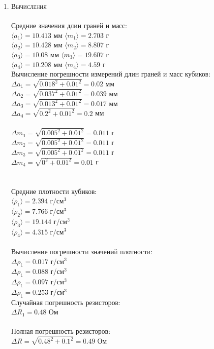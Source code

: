 \documentclass[12pt]{article}
\begin{document}
\begin{enumerate}
    \item \large\textsc{Вычисления} \\
    \\
    Средние значения длин граней и масс: \\
    $ \langle a_1 \rangle = 10.413 $ мм $ \langle m_1 \rangle = 2.703 $ г \\
    $ \langle a_2 \rangle = 10.428 $ мм $ \langle m_2 \rangle = 8.807 $ г \\
    $ \langle a_3 \rangle = 10.08 $ мм $ \langle m_3 \rangle = 19.607 $ г \\
    $ \langle a_4 \rangle = 10.208 $ мм $ \langle m_4 \rangle = 4.59 $ г \\
    Вычисление погрешности измерений длин граней и масс кубиков: \\ 
    $\Delta a_1 = \sqrt{0.018^2 + 0.01^2} = 0.02$ мм \\
    $\Delta a_2 = \sqrt{0.037^2 + 0.01^2} = 0.039$ мм\\
    $\Delta a_3 = \sqrt{0.013^2 + 0.01^2} = 0.017$ мм\\
    $\Delta a_4 = \sqrt{0.2^2 + 0.01^2} = 0.2$ мм\\
    \\
    $\Delta m_1 = \sqrt{0.005^2 + 0.01^2} = 0.011$ г \\
    $\Delta m_2 = \sqrt{0.005^2 + 0.01^2} = 0.011$ г \\
    $\Delta m_3 = \sqrt{0.005^2 + 0.01^2} = 0.011$ г \\
    $\Delta m_4 = \sqrt{0^2 + 0.01^2} = 0.01$ г \\ \\ \\
    Средние плотности кубиков: \\
    $ \langle \rho_1 \rangle = 2.394 $ г/см$^3$ \\
    $ \langle \rho_2 \rangle = 7.766 $ г/см$^3$ \\
    $ \langle \rho_3 \rangle = 19.144 $ г/см$^3$ \\
    $ \langle \rho_4 \rangle = 4.315 $ г/см$^3$ \\ \\
    Вычисление погрешности значений плотности:\\
    $\Delta \rho_1 = 0.017$ г/см$^3$\\
    $\Delta \rho_1 = 0.088$ г/см$^3$\\
    $\Delta \rho_1 = 0.097$ г/см$^3$\\
    $\Delta \rho_1 = 0.253$ г/см$^3$\\
    Случайная погрешность резисторов: \\
    $\Delta R_1 = 0.48 $ Ом \\ \\
    Полная погрешность резисторов: \\
    $\Delta R = \sqrt{0.48^2 + 0.1^2} = 0.49 $ Ом
    

\end{enumerate}
\end{document}
